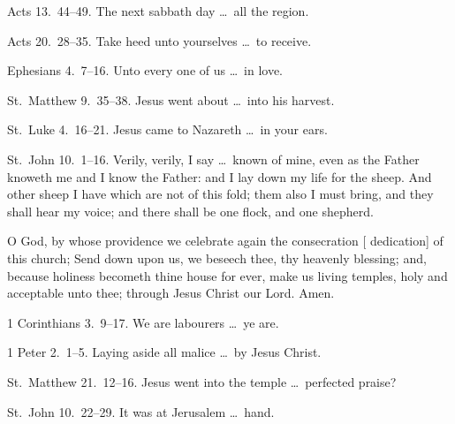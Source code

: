  Acts 13.~44–49.   The next sabbath day \ldots\ all the region.

 Acts 20.~28–35.   Take heed unto yourselves \ldots\ to receive.

 Ephesians 4.~7–16.   Unto every one of us \ldots\ in love.


 St.~Matthew 9.~35–38.   Jesus went about \ldots\ into his harvest.

 St.~Luke 4.~16–21.   Jesus came to Nazareth \ldots\ in your ears.

 St.~John 10.~1–16.   Verily, verily, I say \ldots\ known of mine, even as the Father knoweth me and I know the Father: and I lay down my life for the sheep. And other sheep I have which are not of this fold; them also I must bring, and they shall hear my voice; and there shall be one flock, and one shepherd.

\medskip


{\par}\par


 O God, by whose providence we celebrate again the consecration [ dedication] of this church; Send down upon us, we beseech thee, thy heavenly blessing; and, because holiness becometh thine house for ever, make us living temples, holy and acceptable unto thee; through Jesus Christ our Lord. \R Amen.

 1 Corinthians 3.~9–17.   We are labourers \ldots\ ye are.

 1 Peter 2.~1–5.   Laying aside all malice \ldots\ by Jesus Christ.

 St.~Matthew 21.~12–16.   Jesus went into the temple \ldots\ perfected praise?

 St.~John 10.~22–29. It was at Jerusalem \ldots\ hand.


\medskip



